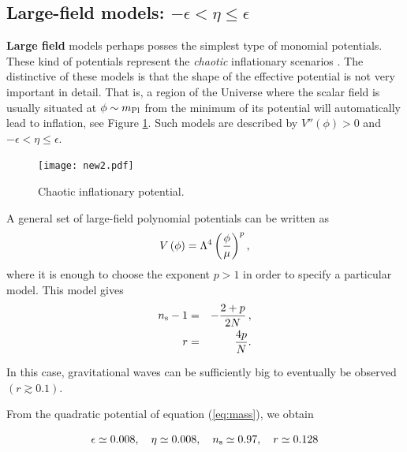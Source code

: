 \documentclass{rmaa}
\begin{document}
\subsection{Large-field models: $-\epsilon < \eta \leq \epsilon$}


\textbf{Large field} models perhaps posses the simplest type of monomial potentials.
These kind of potentials represent the \textit{chaotic} inflationary
scenarios \citep{Linde2}. The distinctive of these models is that the  
shape of the effective potential is not very important in detail. That is, a region
of the Universe where the scalar field is usually situated at $ \phi \sim m_{\rm Pl}$ 
from the minimum of its potential will automatically lead to inflation, see Figure \ref{fig:new1}. Such
models are described by $V''\left(\phi\right) > 0$ and $-\epsilon < \eta
\leq \epsilon$. 
\\

 \begin{figure}
 \begin{center}
  \texttt{[image: new2.pdf]}
	\caption{Chaotic inflationary potential.}
	\label{fig:new1}
\end{center}	
\end{figure}

\noindent
 A general set of large-field polynomial potentials can be written as
%
\begin{equation}
V\left(\phi\right) = \Lambda^4 \left({\phi \over \mu}\right)^p,
\end{equation}
where it is enough to choose the exponent $p>1$ in order to specify a particular model.
%
This model gives
\begin{eqnarray}
n_{\rm s}-1&=&-\frac{2+p}{2N}\, ,\nonumber\\
r&=&\frac{4 p}{N}.
\end{eqnarray}

\noindent
In this case, gravitational waves can be sufficiently big to eventually be observed $(r\gtrsim 0.1)$.

From the quadratic potential of equation (\ref{eq:mass}), we obtain

\begin{equation}
\epsilon \simeq 0.008, \quad \eta \simeq 0.008, \quad n_{\rm s} \simeq 0.97, \quad r \simeq 0.128
\end{equation}
\end{document}
